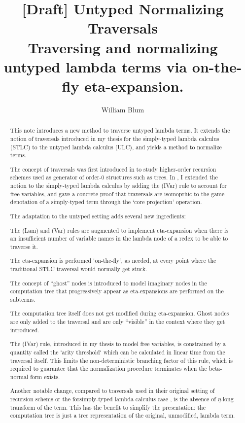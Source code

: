 \documentclass{article}
\author{William Blum}
\title{[Draft] Untyped Normalizing Traversals \\
 {\small Traversing and normalizing untyped lambda terms via on-the-fly eta-expansion.}}
\theoremstyle{definition}
\begin{document}
\maketitle
\begin{abstract}
This note introduces a new method to traverse untyped lambda terms. It extends the notion of traversals introduced in my thesis \cite{BlumPhd} for the simply-typed lambda calculus (STLC) to the untyped lambda calculus (ULC), and yields a method to normalize terms.

The concept of traversals was first introduced in \cite{Ong2006} to study higher-order recursion schemes used as generator of order-$0$ structures such as trees. In \cite{BlumPhd}, I extended the notion to the simply-typed lambda calculus by adding the (IVar) rule to account for free variables, and gave a concrete proof that traversals are isomoprhic to the game denotation of a simply-typed term through the `core projection' operation.

The adaptation to the untyped setting adds several new ingredients:
\begin{compactitem}
\item  The (Lam) and (Var) rules are augmented to implement eta-expansion when there is an insufficient number of variable names in the lambda node of a redex to be able to traverse it.
\item The eta-expansion is performed `on-the-fly`, as needed, at every point where the traditional STLC traversal would normally get stuck.
\item The concept of ``ghost'' nodes is introduced to model imaginary nodes in the computation tree that progressively appear as eta-expansions are performed on the subterms.
\item The computation tree itself does not get modified during eta-expansion. Ghost nodes are only added to the traversal and are only ``visible'' in the context where they get introduced.
\item The (IVar) rule, introduced in my thesis to model free variables, is constrained by a quantity called the `arity threshold` which can be calculated in linear time from the traversal itself. This limits the non-deterministic branching factor of this rule, which is required to guarantee that the normalization procedure terminates when the beta-normal form exists.
\end{compactitem}

Another notable change, compared to traversals used in their original setting of recursion schems \cite{Ong2006} or the forsimply-typed lambda calculus case \cite{BlumPhd}, is the absence of $\eta$-long transform of the term. This has the benefit to simplify the presentation: the computation tree is just a tree representation of the original, unmodified, lambda term.


\end{abstract}
\end{document}
